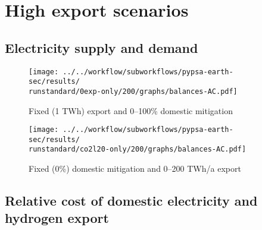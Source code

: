 \section{High export scenarios}
\label{sec:highexportsens}
\subsection{Electricity supply and demand}


\begin{figure*}[h!]
    \centering
    \begin{subfigure}[b]{0.49\linewidth}
        \centering
        \texttt{[image: ../../workflow/subworkflows/pypsa-earth-sec/results/\\runstandard/0exp-only/200/graphs/balances-AC.pdf]}
        \caption{Fixed (1 TWh) export and 0--100\% domestic mitigation}
        \label{fig:balances-ac-0exp}
    \end{subfigure}
    \hfill
    \begin{subfigure}[b]{0.49\linewidth}
        \centering
        \texttt{[image: ../../workflow/subworkflows/pypsa-earth-sec/results/\\runstandard/co2l20-only/200/graphs/balances-AC.pdf]}
        \caption{Fixed (0\%) domestic mitigation and 0--200 TWh/a export}
        \label{fig:balances-ac-co2l20-200}
    \end{subfigure}
    \hfill
    \caption{Electricity supply and demand at fixed export levels and increasing domestic mitigation export (\ref{fig:balances-ac-0exp}) and vice versa (\ref{fig:balances-ac-co2l20-200}). Increasing domestic mitigation first phases out carbon-intensive coal generation in favor of CCGT, at medium to high mitigation the electricity system is fully renewable supported by flexibility through Vehicle-to-Grid (V2G) and sector coupling. Increasing electricity demands cover EVs and hydrogen generation for other sectors.
    At increasing hydrogen exports the additional electricity required for hydrogen electrolysis is covered by onshore wind and solar PV, as imposed by the temporal hydrogen regulation. 
    }
    \label{fig:balances-ac}
\end{figure*}





\subsection{Relative cost of domestic electricity and hydrogen export}

